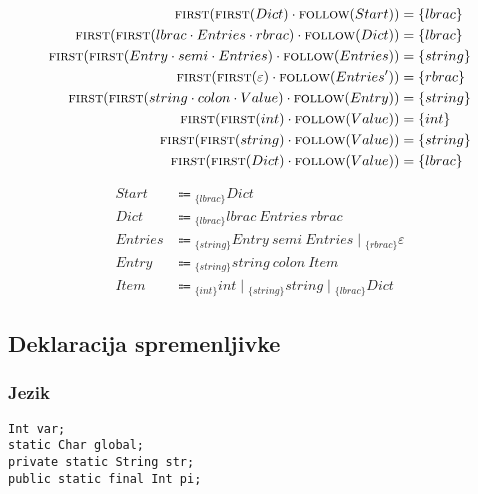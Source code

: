 \documentclass{report}
\newcommand{\Null}{\varepsilon}
\newcommand{\Seq}{\cdot}
\newcommand{\Spc}{\ }
\newcommand{\Union}{\mathrel{|}}
\newcommand{\FIRST}{\textsc{first}}
\newcommand{\FOLLOW}{\textsc{follow}}
\newcommand{\Arrow}{\Coloneq}
\newcommand{\NT}[1]{{#1}}
\newcommand{\T}[1]{{#1}}
\newcommand{\Lookahead}[1]{{}_{\{{#1}\}}}
\begin{document}
\begin{equation*}
  \begin{aligned}
    \FIRST(\FIRST(\NT{Dict}) \Seq \FOLLOW(\NT{Start})) &= \{\T{lbrac}\}\\
    \FIRST(\FIRST(\T{lbrac} \Seq \NT{Entries} \Seq \T{rbrac}) \Seq \FOLLOW(\NT{Dict})) &= \{\T{lbrac}\}\\
    \FIRST(\FIRST(\NT{Entry} \Seq \T{semi} \Seq \NT{Entries}) \Seq \FOLLOW(\NT{Entries})) &= \{\T{string}\}\\
    \FIRST(\FIRST(\Null) \Seq \FOLLOW(\NT{Entries'})) &= \{\T{rbrac}\}\\
    \FIRST(\FIRST(\T{string} \Seq \T{colon} \Seq \NT{Value}) \Seq \FOLLOW(\NT{Entry})) &= \{\T{string}\}\\
    \FIRST(\FIRST(\T{int}) \Seq \FOLLOW(\NT{Value})) &= \{\T{int}\}\\
    \FIRST(\FIRST(\T{string}) \Seq \FOLLOW(\NT{Value})) &= \{\T{string}\}\\
    \FIRST(\FIRST(\T{Dict}) \Seq \FOLLOW(\NT{Value})) &= \{\T{lbrac}\}\\
  \end{aligned}
\end{equation*}

\begin{equation*}
  \begin{aligned}
    \NT{Start} &\Arrow \Lookahead{\T{lbrac}} \NT{Dict}\\
    \NT{Dict} &\Arrow \Lookahead{\T{lbrac}} \T{lbrac} \Spc \NT{Entries} \Spc \T{rbrac}\\
    \NT{Entries} &\Arrow \Lookahead{\T{string}} \NT{Entry} \Spc \T{semi} \Spc \NT{Entries} \Union \Lookahead{\T{rbrac}} \Null\\
    \NT{Entry} &\Arrow \Lookahead{\T{string}} \T{string} \Spc \T{colon} \Spc \NT{Item}\\
    \NT{Item} &\Arrow \Lookahead{\T{int}} \T{int} \Union \Lookahead{\T{string}} \T{string} \Union \Lookahead{\T{lbrac}} \NT{Dict}
  \end{aligned}
\end{equation*}

\subsection{Deklaracija spremenljivke}

\subsubsection*{Jezik}
\begin{verbatim}
Int var;
static Char global;
private static String str;
public static final Int pi;
\end{verbatim}
\end{document}
